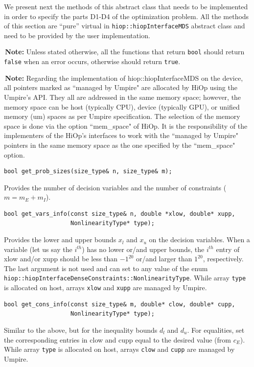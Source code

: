 \documentclass[11pt]{article}
\newcounter{line}
\newcommand{\warningSymbol}{\raisebox{0.9\depth}{\danger}}
\newcommand{\warningcp}[1]{%
        \smallskip \noindent \textcolor{warningColorText}{\warningSymbol{}}\,\textbf{#1} %
    }
\begin{document}
 We present next the methods of this abstract class that needs to be implemented in order to specify the parts D1-D4 of the optimization problem. All the methods of this section are ``pure'' virtual in \texttt{hiop::hiopInterfaceMDS} abstract class  and need to be provided by the user implementation.
 
 

\warningcp{Note:} Unless stated otherwise, all the functions that return \texttt{bool} should return \texttt{false} when an error occurs, otherwise should return \texttt{true}.

\warningcp{Note:} Regarding the implementation of hiop::hiopInterfaceMDS on the device, all pointers marked as ``managed by Umpire" are allocated by HiOp using the Umpire's API. They all are addressed in the same memory space; however, the memory space can be host (typically CPU), device (typically GPU), or unified memory (um) spaces as per Umpire specification. The selection of the memory space is done via the option ``mem\_space" of HiOp. It is the responsibility of the implementers of the HiOp's interfaces to work with the ``managed by Umpire" pointers in the same memory space as the one specified by the ``mem\_space" option. 

\begin{lstlisting} 
bool get_prob_sizes(size_type& n, size_type& m);
\end{lstlisting} 
\noindent Provides the number of decision variables and the number of constraints ($m=m_E+m_I$).


\begin{lstlisting} 
bool get_vars_info(const size_type& n, double *xlow, double* xupp, 
                   NonlinearityType* type);
\end{lstlisting} 

\noindent Provides the lower and upper bounds $x_l$ and $x_u$ on the decision variables. When a variable (let us say the $i^{th}$) has no lower or/and upper bounds, the  $i^{th}$ entry of xlow and/or xupp should be less than $-1^{20}$ or/and larger than $1^{20}$, respectively. The last argument is not used and can set to any value of the enum \texttt{hiop::hiopInterfaceDenseConstraints::NonlinearityType}. While array \texttt{type} is allocated on host, arrays \texttt{xlow} and \texttt{xupp} are managed by Umpire.


\begin{lstlisting} 
bool get_cons_info(const size_type& m, double* clow, double* cupp, 
                   NonlinearityType* type);
\end{lstlisting}
\noindent Similar to the above, but for the inequality bounds $d_l$ and $d_u$. For equalities, set the corresponding entries in clow and cupp equal to the desired value (from $c_E$). While array \texttt{type} is allocated on host, arrays \texttt{clow} and \texttt{cupp} are managed by Umpire.
\end{document}
